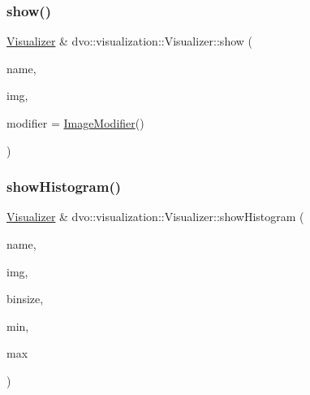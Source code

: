 \subsubsection{\texorpdfstring{show()}{show()}\hspace{0.1cm}{\footnotesize\ttfamily [4/4]}}
{\footnotesize\ttfamily \mbox{\hyperlink{classdvo_1_1visualization_1_1_visualizer}{Visualizer}} \& dvo\+::visualization\+::\+Visualizer\+::show (\begin{DoxyParamCaption}\item[{std\+::string \&}]{name,  }\item[{const cv\+::\+Mat \&}]{img,  }\item[{\mbox{\hyperlink{classdvo_1_1visualization_1_1_visualizer_ac33e0b53e7ef7be64e3230f6c91084a0}{Image\+Modifier}}}]{modifier = {\ttfamily \mbox{\hyperlink{classdvo_1_1visualization_1_1_visualizer_ac33e0b53e7ef7be64e3230f6c91084a0}{Image\+Modifier}}()} }\end{DoxyParamCaption})}

\mbox{\label{classdvo_1_1visualization_1_1_visualizer_a11a1116999ef58353e695a62339bb1c4}} 
\subsubsection{\texorpdfstring{show\+Histogram()}{showHistogram()}\hspace{0.1cm}{\footnotesize\ttfamily [1/2]}}
{\footnotesize\ttfamily \mbox{\hyperlink{classdvo_1_1visualization_1_1_visualizer}{Visualizer}} \& dvo\+::visualization\+::\+Visualizer\+::show\+Histogram (\begin{DoxyParamCaption}\item[{const char $\ast$}]{name,  }\item[{const cv\+::\+Mat \&}]{img,  }\item[{float}]{binsize,  }\item[{float}]{min,  }\item[{float}]{max }\end{DoxyParamCaption})}

\mbox{\label{classdvo_1_1visualization_1_1_visualizer_aca408d9ab7e8e8fc8f9f7c3dd40f0457}} 
